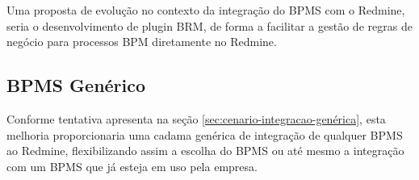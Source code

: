 Uma proposta de evolução no contexto da integração do BPMS com o Redmine, seria o desenvolvimento de plugin BRM, de forma a facilitar a gestão de regras de negócio para processos BPM diretamente no Redmine.

\subsection{BPMS Genérico}

Conforme tentativa apresenta na seção \ref{sec:cenario-integracao-genérica}, esta melhoria proporcionaria uma cadama genérica de integração de qualquer BPMS ao Redmine, flexibilizando assim a escolha do BPMS ou até mesmo a integração com um BPMS que já esteja em uso pela empresa. 